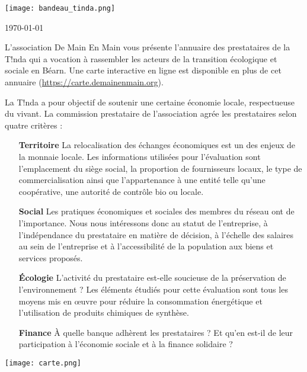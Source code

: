 
  \begin{center}
    \texttt{[image: bandeau\_tinda.png]}
  \end{center}
\today

    \vspace{.5cm}
    \noindent L’association De Main En Main vous présente l’annuaire des prestataires de la T!nda qui a
vocation à rassembler les acteurs de la transition écologique et sociale en Béarn. Une carte interactive en ligne
    est disponible en plus de cet annuaire (\url{https://carte.demainenmain.org}).
    \vspace{.5cm}

    \noindent La T!nda a pour objectif de soutenir une certaine économie locale, respectueuse du vivant. La commission prestataire de l'association agrée les prestataires selon quatre critères :
    \begin{multicols}{2}
    \begin{itemize}
      \item[\textbf{Territoire}]  La relocalisation des échanges économiques est un des enjeux de la monnaie locale. 
        Les informations utilisées pour l'évaluation sont l’emplacement du siège social, la proportion de fournisseurs locaux, le
type de commercialisation ainsi que l’appartenance à une entité telle qu’une coopérative, une autorité de contrôle bio
ou locale.
    \vspace{.2cm}
\item[\textbf{Social}] Les pratiques économiques et sociales des membres du réseau ont de l'importance. Nous nous intéressons donc au statut de
l’entreprise, à l’indépendance du prestataire en matière de décision, à l’échelle des salaires au sein de l’entreprise
et à l’accessibilité de la population aux biens et services proposés.
    \vspace{.2cm}
\item[\textbf{Écologie}] L’activité du prestataire est-elle soucieuse de la préservation de l'environnement ? Les éléments étudiés pour cette
évaluation sont tous les moyens mis en œuvre pour réduire la consommation énergétique et l’utilisation de produits
chimiques de synthèse.
    \vspace{.2cm}
\item[\textbf{Finance}] À quelle banque adhèrent les prestataires ? Et qu’en est-il de leur participation à l’économie sociale et à la
finance solidaire ?
    \end{itemize}

  \begin{center}
    \texttt{[image: carte.png]}
  \end{center}
\end{multicols}


